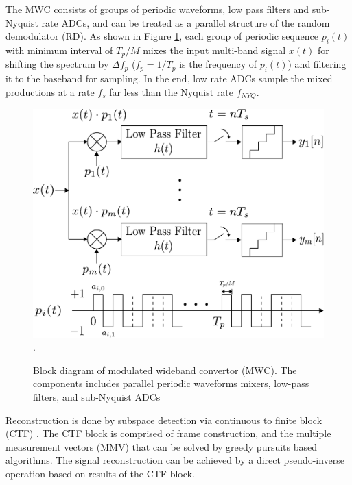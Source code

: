 The MWC consists of groups of periodic waveforms, low pass filters and sub-Nyquist rate ADCs, and can be treated as a parallel structure of the random demodulator (RD). As shown in Figure \ref{MWC1}, each group of periodic sequence $p_i(t)$ with minimum interval of $T_p/M$ mixes the input multi-band signal $x(t)$ for shifting the spectrum by $\Delta f_p$ ($f_p = 1/{T_p}$ is the frequency of $p_i(t)$) and filtering it to the baseband for sampling. In the end, low rate ADCs sample the mixed productions at a rate $f_s$ far less than the Nyquist rate $f_{NYQ}$.
\begin{figure}
\centering
\includegraphics[width=0.5\columnwidth]{figs/MWC1.pdf}
\DeclareGraphicsExtensions.
\caption{Block diagram of modulated wideband convertor (MWC). The components includes parallel periodic waveforms mixers, low-pass filters, and sub-Nyquist ADCs}\label{MWC1}
\end{figure}

Reconstruction is done by subspace detection via continuous to finite block (CTF) \cite{mishali2009blind}. The CTF block is comprised of frame construction, and the multiple measurement vectors (MMV) that can be solved by greedy pursuits based algorithms. The signal reconstruction can be achieved by a direct pseudo-inverse operation based on results of the CTF block.

